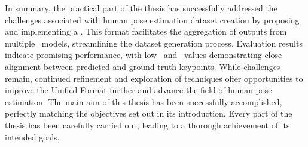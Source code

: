In summary, the practical part of the thesis has successfully addressed the challenges associated with human pose estimation dataset creation by proposing and implementing a . This format facilitates the aggregation of outputs from multiple \NN\ models, streamlining the dataset generation process. Evaluation results indicate promising performance, with low \APE\ and \MSE\ values demonstrating close alignment between predicted and ground truth keypoints. While challenges remain, continued refinement and exploration of techniques offer opportunities to improve the Unified Format further and advance the field of human pose estimation. The main aim of this thesis has been successfully accomplished, perfectly matching the objectives set out in its introduction. Every part of the thesis has been carefully carried out, leading to a thorough achievement of its intended goals.